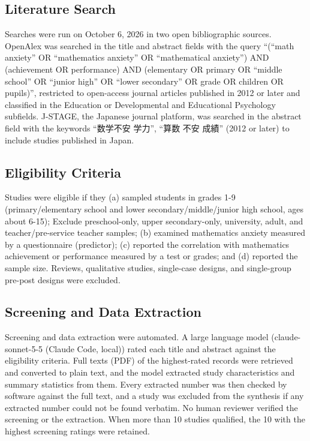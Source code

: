 \documentclass[man,a4paper,12pt,floatsintext,nolmodern,notab]{apa7}
\begin{document}
\subsection{Literature Search}
Searches were run on October 6, 2026 in two open bibliographic sources. OpenAlex was searched in the title and abstract fields with the query “(“math anxiety” OR “mathematics anxiety” OR “mathematical anxiety”) AND (achievement OR performance) AND (elementary OR primary OR “middle school” OR “junior high” OR “lower secondary” OR grade OR children OR pupils)”, restricted to open-access journal articles published in 2012 or later and classified in the Education or Developmental and Educational Psychology subfields. J-STAGE, the Japanese journal platform, was searched in the abstract field with the keywords “{\cjkfont 数学不安} {\cjkfont 学力}”, “{\cjkfont 算数} {\cjkfont 不安} {\cjkfont 成績}” (2012 or later) to include studies published in Japan.

\subsection{Eligibility Criteria}
Studies were eligible if they (a) sampled students in grades 1-9 (primary/elementary school and lower secondary/middle/junior high school, ages about 6-15); Exclude preschool-only, upper secondary-only, university, adult, and teacher/pre-service teacher samples; (b) examined mathematics anxiety measured by a questionnaire (predictor); (c) reported the correlation with mathematics achievement or performance measured by a test or grades; and (d) reported the sample size. Reviews, qualitative studies, single-case designs, and single-group pre-post designs were excluded.

\subsection{Screening and Data Extraction}
Screening and data extraction were automated. A large language model (claude-sonnet-5-5 (Claude Code, local)) rated each title and abstract against the eligibility criteria. Full texts (PDF) of the highest-rated records were retrieved and converted to plain text, and the model extracted study characteristics and summary statistics from them. Every extracted number was then checked by software against the full text, and a study was excluded from the synthesis if any extracted number could not be found verbatim. No human reviewer verified the screening or the extraction. When more than 10 studies qualified, the 10 with the highest screening ratings were retained.
\end{document}
